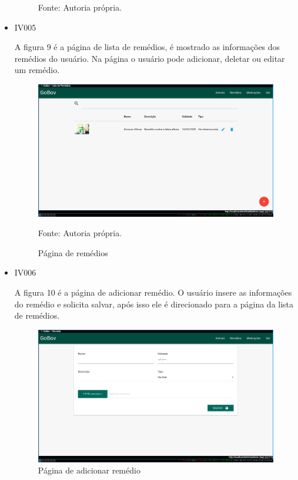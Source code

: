 \begin{itemize}
\begin{figure}[H]
\begin{center}
		Fonte: Autoria própria.
	\end{center}
\end{figure}


\item IV005

A figura 9 é a página de lista de remédios, é mostrado as informações dos remédios do usuário. Na página o usuário pode adicionar, deletar ou editar um remédio.
\begin{figure}[H]
	\begin{center}
		\caption{Página de remédios}
		\includegraphics[width=\textwidth]{../img/prototipos/listaRemedio.png}

		Fonte: Autoria própria.
	\end{center}
\end{figure}

\item IV006

A figura 10 é a página de adicionar remédio. O usuário insere as informações do remédio e solicita salvar, após isso ele é direcionado para a página da lista de remédios.
\begin{figure}[H]
	\begin{center}
		\caption{Página de adicionar remédio}
		\includegraphics[width=\textwidth]{../img/prototipos/addRemedio.png}


\end{center}
\end{figure}
\end{itemize}
